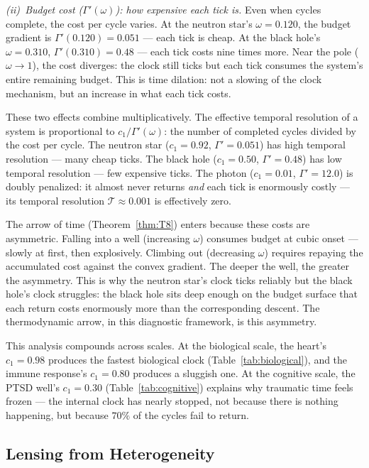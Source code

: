 \documentclass[
  aps,
  prd,
  twocolumn,
  superscriptaddress,
  nofootinbib,
  floatfix
]{revtex4-2}
\newcommand{\Gam}{\Gamma}
\begin{document}
\emph{(ii)~Budget cost ($\Gam'(\omega)$): how expensive
each tick is.}
Even when cycles complete, the cost per cycle varies.
At the neutron star's $\omega = 0.120$, the budget gradient
is $\Gam'(0.120) = 0.051$ --- each tick is cheap.  At the
black hole's $\omega = 0.310$, $\Gam'(0.310) = 0.48$ ---
each tick costs nine times more.  Near the pole
($\omega \to 1$), the cost diverges: the clock still ticks
but each tick consumes the system's entire remaining
budget.  This is time dilation: not a slowing of the clock
mechanism, but an increase in what each tick costs.

These two effects combine multiplicatively.  The effective
temporal resolution of a system is proportional to
$c_1 / \Gam'(\omega)$: the number of completed cycles
divided by the cost per cycle.  The neutron star
($c_1 = 0.92$, $\Gam' = 0.051$) has high temporal
resolution --- many cheap ticks.  The black hole
($c_1 = 0.50$, $\Gam' = 0.48$) has low temporal
resolution --- few expensive ticks.  The photon
($c_1 = 0.01$, $\Gam' = 12.0$) is doubly penalized: it
almost never returns \emph{and} each tick is enormously
costly --- its temporal resolution $\mathcal{T} \approx 0.001$
is effectively zero.

The arrow of time (Theorem~\ref{thm:T8}) enters because
these costs are asymmetric.  Falling into a well (increasing
$\omega$) consumes budget at cubic onset --- slowly at first,
then explosively.  Climbing out (decreasing $\omega$)
requires repaying the accumulated cost against the convex
gradient.  The deeper the well, the greater the asymmetry.
This is why the neutron star's clock ticks reliably but the
black hole's clock struggles: the black hole sits deep
enough on the budget surface that each return costs
enormously more than the corresponding descent.  The
thermodynamic arrow, in this diagnostic framework, is this
asymmetry.

This analysis compounds across scales.  At the biological
scale, the heart's $c_1 = 0.98$ produces the fastest
biological clock (Table~\ref{tab:biological}), and the
immune response's $c_1 = 0.80$ produces a sluggish one.
At the cognitive scale, the PTSD well's $c_1 = 0.30$
(Table~\ref{tab:cognitive}) explains why traumatic time
feels frozen --- the internal clock has nearly stopped,
not because there is nothing happening, but because $70\%$
of the cycles fail to return.


\subsection{Lensing from Heterogeneity}
\end{document}
